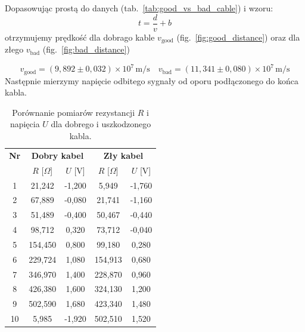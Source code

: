 \documentclass[12pt]{article}
\begin{document}
Dopasowując prostą do danych (tab.~\ref{tab:good_vs_bad_cable}) i wzoru:
\[
	t = \frac{d}{v} + b
\]
otrzymujemy prędkość dla dobrago kable \(v_{\mathrm{good}}\) (fig.~\ref{fig:good_distance}) oraz dla złego \(v_{\mathrm{bad}}\) (fig.~\ref{fig:bad_distance})

\[
	v_{\mathrm{good}} = (9{,}892 \pm 0{,}032) \times 10^{7} \, \mathrm{m/s} \quad
	v_{\mathrm{bad}} = (11{,}341 \pm 0{,}080) \times 10^{7} \, \mathrm{m/s}
\]
Następnie mierzymy napięcie odbitego sygnały od oporu podłączonego do końca kabla.

\begin{table}[H]
	\centering
	\begin{tabular}{c|cc|cc}
		\toprule
		\textbf{Nr} & \multicolumn{2}{c|}{\textbf{Dobry kabel}} & \multicolumn{2}{c}{\textbf{Zły kabel}}                             \\
		            & $R$ [$\Omega$]                            & $U$ [V]                                & $R$ [$\Omega$] & $U$ [V]  \\
		\midrule
		1           & 21{,}242                                  & -1{,}200                               & 5{,}949        & -1{,}760 \\
		2           & 67{,}889                                  & -0{,}080                               & 21{,}741       & -1{,}160 \\
		3           & 51{,}489                                  & -0{,}400                               & 50{,}467       & -0{,}440 \\
		4           & 98{,}712                                  & 0{,}320                                & 73{,}712       & -0{,}040 \\
		5           & 154{,}450                                 & 0{,}800                                & 99{,}180       & 0{,}280  \\
		6           & 229{,}724                                 & 1{,}080                                & 154{,}913      & 0{,}680  \\
		7           & 346{,}970                                 & 1{,}400                                & 228{,}870      & 0{,}960  \\
		8           & 426{,}380                                 & 1{,}600                                & 324{,}130      & 1{,}200  \\
		9           & 502{,}590                                 & 1{,}680                                & 423{,}340      & 1{,}480  \\
		10          & 5{,}985                                   & -1{,}920                               & 502{,}510      & 1{,}520  \\
		\bottomrule
	\end{tabular}
	\caption{Porównanie pomiarów rezystancji $R$ i napięcia $U$ dla dobrego i uszkodzonego kabla.}
	\label{tab:good_vs_bad_cable_voltage}
\end{table}
\end{document}
